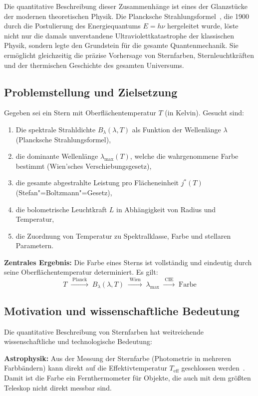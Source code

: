﻿\documentclass[a4paper,12pt]{article}
\theoremstyle{definition}
\begin{document}
Die quantitative Beschreibung dieser Zusammenhänge ist eines der Glanzstücke der
modernen theoretischen Physik. Die Plancksche Strahlungsformel~\cite{planck1900},
die 1900 durch die Postulierung des Energiequantums $E = h\nu$ hergeleitet wurde, löste
nicht nur die damals unverstandene Ultraviolettkatastrophe der klassischen Physik,
sondern legte den Grundstein für die gesamte Quantenmechanik. Sie ermöglicht gleichzeitig
die präzise Vorhersage von Sternfarben, Sternleuchtkräften und der thermischen Geschichte
des gesamten Universums.

\subsection{Problemstellung und Zielsetzung}

Gegeben sei ein Stern mit Oberflächentemperatur $T$ (in Kelvin). Gesucht sind:
\begin{enumerate}
    \item Die spektrale Strahldichte $B_\lambda(\lambda, T)$ als Funktion der Wellenlänge $\lambda$
          (Plancksche Strahlungsformel),
    \item die dominante Wellenlänge $\lambda_{\max}(T)$, welche die wahrgenommene Farbe bestimmt
          (Wien'sches Verschiebungsgesetz),
    \item die gesamte abgestrahlte Leistung pro Flächeneinheit $j^*(T)$
          (Stefan"=Boltzmann"=Gesetz),
    \item die bolometrische Leuchtkraft $L$ in Abhängigkeit von Radius und Temperatur,
    \item die Zuordnung von Temperatur zu Spektralklasse, Farbe und stellaren Parametern.
\end{enumerate}

\textbf{Zentrales Ergebnis:} Die Farbe eines Sterns ist vollständig und eindeutig
durch seine Oberflächentemperatur determiniert. Es gilt:
\[
    T \;\xrightarrow{\;\text{Planck}\;}\; B_\lambda(\lambda,T)
    \;\xrightarrow{\;\text{Wien}\;}\; \lambda_{\max}
    \;\xrightarrow{\;\text{CIE}\;}\; \text{Farbe}
\]

\subsection{Motivation und wissenschaftliche Bedeutung}

Die quantitative Beschreibung von Sternfarben hat weitreichende wissenschaftliche
und technologische Bedeutung:

\textbf{Astrophysik:} Aus der Messung der Sternfarbe (Photometrie in mehreren
Farbbändern) kann direkt auf die Effektivtemperatur $T_{\text{eff}}$ geschlossen
werden~\cite{allen2000}. Damit ist die Farbe ein Fernthermometer für Objekte,
die auch mit dem größten Teleskop nicht direkt messbar sind.
\end{document}
